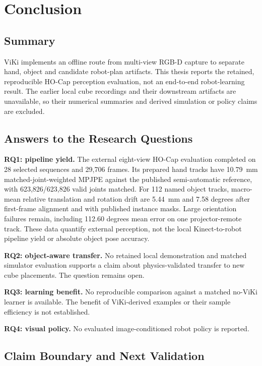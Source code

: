\chapter{Conclusion}
\label{ch:concl}

\section{Summary}
\label{sec:summary}

ViKi implements an offline route from multi-view RGB-D capture to
separate hand, object and candidate robot-plan artifacts. This thesis
reports the retained, reproducible HO-Cap perception evaluation, not
an end-to-end robot-learning result. The earlier local cube recordings
and their downstream artifacts are unavailable, so their numerical
summaries and derived simulation or policy claims are excluded.

\section{Answers to the Research Questions}
\label{sec:answers}

\textbf{RQ1: pipeline yield.} The external eight-view HO-Cap evaluation
completed on 28 selected sequences and 29,706 frames. Its prepared hand
tracks have 10.79~mm matched-joint-weighted MPJPE against the published
semi-automatic reference, with 623,826/623,826 valid joints matched.
For 112 named object tracks, macro-mean relative translation and rotation
drift are 5.44~mm and 7.58 degrees after first-frame alignment and with
published instance masks. Large orientation failures remain, including
112.60 degrees mean error on one projector-remote track. These data
quantify external perception, not the local Kinect-to-robot pipeline
yield or absolute object pose accuracy.

\textbf{RQ2: object-aware transfer.} No retained local demonstration
and matched simulator evaluation supports a claim about physics-validated
transfer to new cube placements. The question remains open.

\textbf{RQ3: learning benefit.} No reproducible comparison against
a matched no-ViKi learner is available. The benefit of ViKi-derived
examples or their sample efficiency is not established.

\textbf{RQ4: visual policy.} No evaluated image-conditioned robot policy
is reported.

\section{Claim Boundary and Next Validation}
\label{sec:contrib-final}

